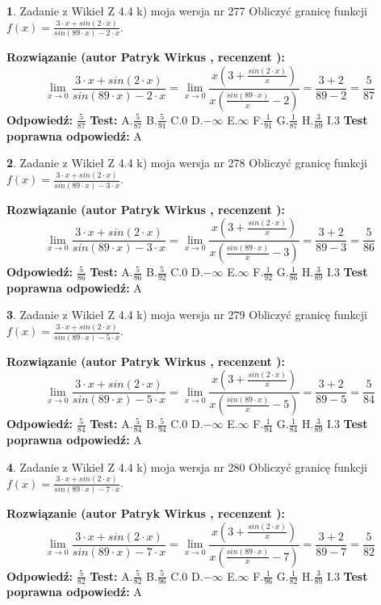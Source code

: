 \documentclass[12pt, a4paper]{article}
\theoremstyle{definition} %
\newtheorem{zad}{}
\newcommand{\zadStart}[1]{\begin{zad}#1\newline}
\newcommand{\zadStop}{\end{zad}}
\newcommand{\rozwStart}[2]{\noindent \textbf{Rozwiązanie (autor #1 , recenzent #2): }\newline}
\newcommand{\rozwStop}{\newline}
\newcommand{\odpStart}{\noindent \textbf{Odpowiedź:}\newline}
\newcommand{\odpStop}{\newline}
\newcommand{\testStart}{\noindent \textbf{Test:}\newline}
\newcommand{\testStop}{\newline}
\newcommand{\kluczStart}{\noindent \textbf{Test poprawna odpowiedź:}\newline}
\newcommand{\kluczStop}{\newline}
\begin{document}
\zadStart{Zadanie z Wikieł Z 4.4 k) moja wersja nr 277}
Obliczyć granicę funkcji $f(x)=\frac{3\cdot x +sin(2\cdot x)}{sin(89\cdot x) -2\cdot x}$.
\zadStop
\rozwStart{Patryk Wirkus}{}
$$\lim\limits_{x\to 0}\frac{3\cdot x +sin(2\cdot x)}{sin(89\cdot x) -2\cdot x}
=\lim\limits_{x\to 0}\frac{x(3+\frac{sin(2\cdot x)}{x})}{x(\frac{sin(89\cdot x)}{x}-2)}
=\frac{3+2}{89-2} = \frac{5}{87}$$
\rozwStop
\odpStart
$\frac{5}{87}$
\odpStop
\testStart
A.$\frac{5}{87}$
B.$\frac{5}{91}$
C.$0$
D.$-\infty$
E.$\infty$
F.$\frac{1}{91}$
G.$\frac{1}{87}$
H.$\frac{3}{89}$
I.$3$
\testStop
\kluczStart
A
\kluczStop



\zadStart{Zadanie z Wikieł Z 4.4 k) moja wersja nr 278}
Obliczyć granicę funkcji $f(x)=\frac{3\cdot x +sin(2\cdot x)}{sin(89\cdot x) -3\cdot x}$.
\zadStop
\rozwStart{Patryk Wirkus}{}
$$\lim\limits_{x\to 0}\frac{3\cdot x +sin(2\cdot x)}{sin(89\cdot x) -3\cdot x}
=\lim\limits_{x\to 0}\frac{x(3+\frac{sin(2\cdot x)}{x})}{x(\frac{sin(89\cdot x)}{x}-3)}
=\frac{3+2}{89-3} = \frac{5}{86}$$
\rozwStop
\odpStart
$\frac{5}{86}$
\odpStop
\testStart
A.$\frac{5}{86}$
B.$\frac{5}{92}$
C.$0$
D.$-\infty$
E.$\infty$
F.$\frac{1}{92}$
G.$\frac{1}{86}$
H.$\frac{3}{89}$
I.$3$
\testStop
\kluczStart
A
\kluczStop



\zadStart{Zadanie z Wikieł Z 4.4 k) moja wersja nr 279}
Obliczyć granicę funkcji $f(x)=\frac{3\cdot x +sin(2\cdot x)}{sin(89\cdot x) -5\cdot x}$.
\zadStop
\rozwStart{Patryk Wirkus}{}
$$\lim\limits_{x\to 0}\frac{3\cdot x +sin(2\cdot x)}{sin(89\cdot x) -5\cdot x}
=\lim\limits_{x\to 0}\frac{x(3+\frac{sin(2\cdot x)}{x})}{x(\frac{sin(89\cdot x)}{x}-5)}
=\frac{3+2}{89-5} = \frac{5}{84}$$
\rozwStop
\odpStart
$\frac{5}{84}$
\odpStop
\testStart
A.$\frac{5}{84}$
B.$\frac{5}{94}$
C.$0$
D.$-\infty$
E.$\infty$
F.$\frac{1}{94}$
G.$\frac{1}{84}$
H.$\frac{3}{89}$
I.$3$
\testStop
\kluczStart
A
\kluczStop



\zadStart{Zadanie z Wikieł Z 4.4 k) moja wersja nr 280}
Obliczyć granicę funkcji $f(x)=\frac{3\cdot x +sin(2\cdot x)}{sin(89\cdot x) -7\cdot x}$.
\zadStop
\rozwStart{Patryk Wirkus}{}
$$\lim\limits_{x\to 0}\frac{3\cdot x +sin(2\cdot x)}{sin(89\cdot x) -7\cdot x}
=\lim\limits_{x\to 0}\frac{x(3+\frac{sin(2\cdot x)}{x})}{x(\frac{sin(89\cdot x)}{x}-7)}
=\frac{3+2}{89-7} = \frac{5}{82}$$
\rozwStop
\odpStart
$\frac{5}{82}$
\odpStop
\testStart
A.$\frac{5}{82}$
B.$\frac{5}{96}$
C.$0$
D.$-\infty$
E.$\infty$
F.$\frac{1}{96}$
G.$\frac{1}{82}$
H.$\frac{3}{89}$
I.$3$
\testStop
\kluczStart
A
\kluczStop
\end{document}
